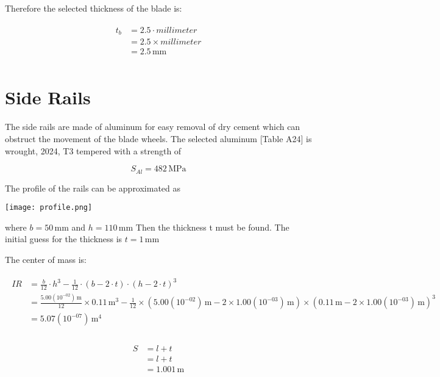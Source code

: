 \documentclass[11pt]{article}
\begin{document}
Therefore the selected thickness of the blade is:

\begin{align}
\begin{split}
t_{b}	&= 2.5 \cdot millimeter\\
		&= 2.5 \times millimeter\\
		&= 2.5\,\mathrm{mm}\\
\end{split}
\end{align}

\section{Side Rails}

The side rails are made of aluminum for easy removal of dry cement which can obstruct the movement of the blade wheels. The selected aluminum [Table A24] is wrought, 2024, T3 tempered with a strength of 

\begin{equation}
S_{Al}	= 482\,\mathrm{MPa}
\end{equation}

The profile of the rails can be approximated as

\texttt{[image: profile.png]}

where 
 $b = 50\,\mathrm{mm}$ and 
 $h = 110\,\mathrm{mm}$ Then the thickness t must be found. The initial guess for the thickness is
 $t = 1\,\mathrm{mm}$ 

The center of mass is:

\begin{align}
\begin{split}
IR	&= \frac{b}{12} \cdot h^{3} - \frac{1}{12} \cdot \left(b - 2 \cdot t\right) \cdot \left(h - 2 \cdot t\right)^{3}\\
	&= \frac{5.00(10^{-02})\,\mathrm{m}}{12} \times 0.11\,\mathrm{m}^{3} - \frac{1}{12} \times \left(5.00(10^{-02})\,\mathrm{m} - 2 \times 1.00(10^{-03})\,\mathrm{m}\right) \times \left(0.11\,\mathrm{m} - 2 \times 1.00(10^{-03})\,\mathrm{m}\right)^{3}\\
	&= 5.07(10^{-07})\,\mathrm{m^{4}}\\
\end{split}
\end{align}

\begin{align}
\begin{split}
S	&= l + t\\
	&= l + t\\
	&= 1.001\,\mathrm{m}\\
\end{split}
\end{align}
\end{document}

